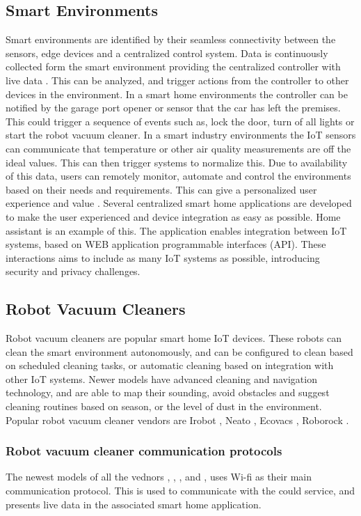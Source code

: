 \subsection{Smart Environments}
Smart environments are identified by their seamless connectivity between the sensors, edge devices and a centralized control system. Data is continuously collected form the smart environment providing the centralized controller with live data \cite{lin2016iot}. This can be analyzed, and trigger actions from the controller to other devices in the environment. In a smart home environments the controller can be notified by the garage port opener or sensor that the car has left the premises. This could trigger a sequence of events such as, lock the door, turn of all lights or start the robot vacuum cleaner. In a smart industry environments the IoT sensors can communicate that temperature or other air quality measurements are off the ideal values. This can then trigger systems to normalize this. Due to availability of this data, users can remotely monitor, automate and control the environments based on their needs and requirements. This can give a personalized user experience and value \cite{mantas2011security}. Several centralized smart home applications are developed to make the user experienced and device integration as easy as possible. Home assistant \cite{homeassistant2023} is an example of this. The application enables integration between IoT systems, based on WEB application programmable interfaces (API). These interactions aims to include as many IoT systems as possible, introducing security and privacy challenges. 

\subsection{Robot Vacuum Cleaners}
Robot vacuum cleaners are popular smart home IoT devices. These robots can clean the smart environment autonomously, and can be configured to clean based on scheduled cleaning tasks, or automatic cleaning based on integration with other IoT systems. Newer models have advanced cleaning and navigation technology, and are able to map their sounding, avoid obstacles and suggest cleaning routines based on season, or the level of dust in the environment. Popular robot vacuum cleaner vendors are Irobot \cite{irobot}, Neato \cite{Neato}, Ecovacs \cite{ecovacs}, Roborock \cite{roborock}. 


\subsubsection{Robot vacuum cleaner communication protocols}
The newest models of all the vednors \cite{irobot}, \cite{Neato}, \cite{ecovacs}, \cite{roborock} and \cite{neatsvor}, uses Wi-fi as their main communication protocol. This is used to communicate with the could service, and presents live data in the associated smart home application.

